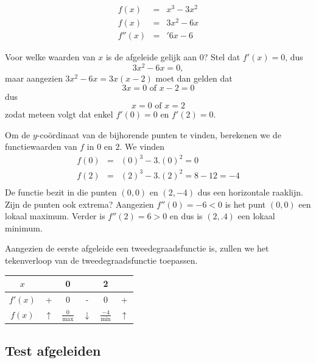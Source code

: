 \begin{voorbeeld}
	\begin{eqnarray*}
	f(x) & =& x^3-3x^2 \\
	f(x) & =& 3x^2-6x \\
	f''(x) & =& '6x-6 
	\end{eqnarray*}

%


	Voor welke waarden van $x$ is de afgeleide gelijk aan 0? Stel dat $f'(x)=0$, dus
	\begin{equation*}
	3x^2-6x=0,
	\end{equation*}
	maar aangezien $3x^2-6x=3x(x-2)$ moet dan gelden dat
	\begin{equation*}
	3x =0 \text{ of } x-2=0
	\end{equation*}
	dus
	\begin{equation*}
	x=0 \text{ of } x=2
	\end{equation*}
	zodat meteen volgt dat enkel $f'(0)=0$ en $f'(2)=0$.
	
	Om de $y$-co\"ordinaat van de bijhorende punten te vinden, berekenen we de functiewaarden van $f$ in $0$ en $2$. We vinden
	\begin{eqnarray*}
		f(0)&=&(0)^3-3.(0)^2= 0 \\
		f(2)&=&(2)^3-3.(2)^2= 8-12=-4 \\
	\end{eqnarray*}
	De functie bezit in die punten $(0,0)$ en $(2,-4)$ dus een horizontale raaklijn. Zijn de punten ook extrema? 
	Aangezien $f''(0)=-6<0$ is het punt $(0,0)$ een lokaal maximum. Verder is $f''(2)=6>0$ en dus is $(2,.4)$ een lokaal minimum.
	
	Aangezien de eerste afgeleide een tweedegraadsfunctie is, zullen we het tekenverloop van de tweedegraadsfunctie toepassen.
	
	\begin{center}
		\begin{tabular}{c|ccccc}
			$x$ & & 0 & & 2 & \\
			\hline 
			$f'(x)$ & + & 0 & - & 0 & + \\
			\hline
			$f(x)$ & $\uparrow$  & $\frac{0}{\text{max}}$ & $\downarrow$ & $\frac{-4}{\text{min}}$ & $\uparrow$
		\end{tabular}
	\end{center}


\end{voorbeeld}

\subsection{Test afgeleiden}





